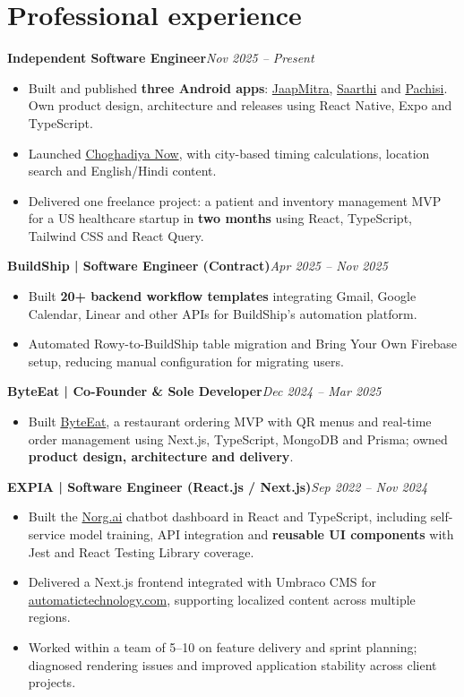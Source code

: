 \documentclass[a4paper,10pt]{article}
\newcommand{\job}[2]{\textbf{#1}\hfill\textit{#2}}
\begin{document}
\section{Professional experience}
\job{Independent Software Engineer}{Nov 2025 -- Present}
\begin{itemize}
\item Built and published \textbf{three Android apps}: \href{https://play.google.com/store/apps/details?id=com.g1mishra.jaapmitra}{JaapMitra}, \href{https://play.google.com/store/apps/details?id=com.g1mishra.saarthi}{Saarthi} and \href{https://play.google.com/store/apps/details?id=com.g1mishra.pachisi}{Pachisi}. Own product design, architecture and releases using React Native, Expo and TypeScript.
\item Launched \href{https://choghadiyanow.com/}{Choghadiya Now}, with city-based timing calculations, location search and English/Hindi content.
\item Delivered one freelance project: a patient and inventory management MVP for a US healthcare startup in \textbf{two months} using React, TypeScript, Tailwind CSS and React Query.
\end{itemize}
\job{BuildShip | Software Engineer (Contract)}{Apr 2025 -- Nov 2025}
\begin{itemize}
\item Built \textbf{20+ backend workflow templates} integrating Gmail, Google Calendar, Linear and other APIs for BuildShip's automation platform.
\item Automated Rowy-to-BuildShip table migration and Bring Your Own Firebase setup, reducing manual configuration for migrating users.
\end{itemize}
\job{ByteEat | Co-Founder \& Sole Developer}{Dec 2024 -- Mar 2025}
\begin{itemize}
\item Built \href{https://byteeat.vercel.app}{ByteEat}, a restaurant ordering MVP with QR menus and real-time order management using Next.js, TypeScript, MongoDB and Prisma; owned \textbf{product design, architecture and delivery}.
\end{itemize}
\job{EXPIA | Software Engineer (React.js / Next.js)}{Sep 2022 -- Nov 2024}
\begin{itemize}
\item Built the \href{https://norg.ai}{Norg.ai} chatbot dashboard in React and TypeScript, including self-service model training, API integration and \textbf{reusable UI components} with Jest and React Testing Library coverage.
\item Delivered a Next.js frontend integrated with Umbraco CMS for \href{https://www.automatictechnology.com}{automatictechnology.com}, supporting localized content across multiple regions.
\item Worked within a team of 5--10 on feature delivery and sprint planning; diagnosed rendering issues and improved application stability across client projects.
\end{itemize}
\end{document}
